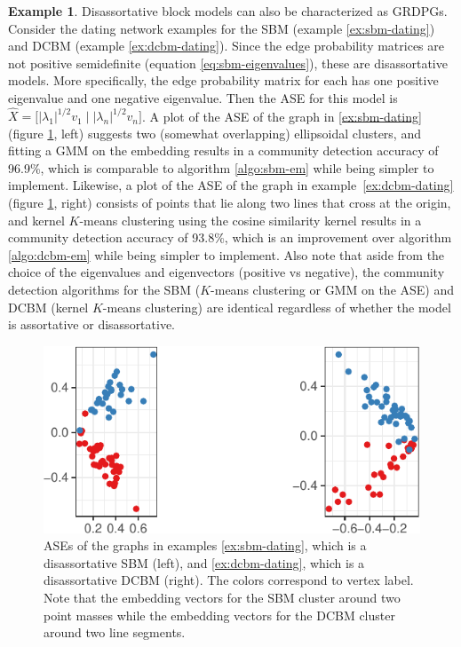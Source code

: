 \documentclass[
  12pt,
]{article}
\theoremstyle{definition}
\theoremstyle{definition}
\newtheorem{example}{Example}[section]
\theoremstyle{definition}
\theoremstyle{definition}
\theoremstyle{remark}
\begin{document}
\begin{example}
Disassortative block models can also be characterized as GRDPGs. 
Consider the dating network examples for the SBM (example \ref{ex:sbm-dating}) and DCBM (example \ref{ex:dcbm-dating}). 
Since the edge probability matrices are not positive semidefinite (equation \ref{eq:sbm-eigenvalues}), these are disassortative models. 
More specifically, the edge probability matrix for each has one positive eigenvalue and one negative eigenvalue. 
Then the ASE for this model is $\hat{X} = \Big[ |\lambda_1|^{1/2} v_1 \mid |\lambda_n|^{1/2} v_n \Big]$. 
A plot of the ASE of the graph in \ref{ex:sbm-dating} (figure \ref{fig:dating-ase}, left) suggests two (somewhat overlapping) ellipsoidal clusters, and fitting a GMM on the embedding results in a community detection accuracy of 96.9\%, which is comparable to algorithm \ref{algo:sbm-em} while being simpler to implement. 
Likewise, a plot of the ASE of the graph in example~\ref{ex:dcbm-dating} (figure \ref{fig:dating-ase}, right) consists of points that lie along two lines that cross at the origin, and kernel $K$-means clustering using the cosine similarity kernel results in a community detection accuracy of 93.8\%, which is an improvement over algorithm \ref{algo:dcbm-em} while being simpler to implement. 
Also note that aside from the choice of the eigenvalues and eigenvectors (positive vs negative), the community detection algorithms for the SBM ($K$-means clustering or GMM on the ASE) and DCBM (kernel $K$-means clustering) are identical regardless of whether the model is assortative or disassortative. 

\begin{figure}[H]

{\centering \includegraphics{draft_files/figure-latex/dating-ase-1} 

}

\caption{ASEs of the graphs in examples \ref{ex:sbm-dating}, which is a disassortative SBM (left), and \ref{ex:dcbm-dating}, which is a disassortative DCBM (right). The colors correspond to vertex label. Note that the embedding vectors for the SBM cluster around two point masses while the embedding vectors for the DCBM cluster around two line segments.}\label{fig:dating-ase}
\end{figure}
\end{example}
\end{document}
